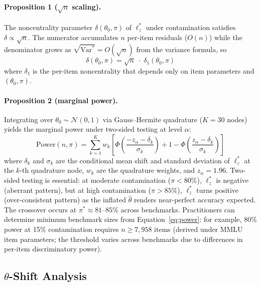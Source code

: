 \paragraph{Proposition 1 ($\sqrt{n}$ scaling).}
The noncentrality parameter $\delta(\theta_0, \pi)$ of $\ell_z^*$ under contamination satisfies $\delta \propto \sqrt{n}$.
The numerator accumulates $n$ per-item residuals ($O(n)$) while the denominator grows as $\sqrt{\mathrm{Var}^*} = O(\sqrt{n})$ from the \citet{snijders2001} variance formula, so
\begin{equation}
  \delta(\theta_0, \pi) = \sqrt{n}\;\cdot\;\delta_1(\theta_0, \pi)
  \label{eq:sqrt_n}
\end{equation}
where $\delta_1$ is the per-item noncentrality that depends only on item parameters and $(\theta_0, \pi)$.

\paragraph{Proposition 2 (marginal power).}
Integrating over $\theta_0 \sim \mathcal{N}(0,1)$ via Gauss--Hermite quadrature ($K{=}30$ nodes) yields the marginal power under two-sided testing at level $\alpha$:
\begin{equation}
  \mathrm{Power}(n, \pi) = \sum_{k=1}^{K} w_k \left[\Phi\!\left(\frac{-z_\alpha - \delta_k}{\sigma_k}\right) + 1 - \Phi\!\left(\frac{z_\alpha - \delta_k}{\sigma_k}\right)\right]
  \label{eq:power}
\end{equation}
where $\delta_k$ and $\sigma_k$ are the conditional mean shift and standard deviation of $\ell_z^*$ at the $k$-th quadrature node, $w_k$ are the quadrature weights, and $z_\alpha = 1.96$.
Two-sided testing is essential: at moderate contamination ($\pi < 80\%$), $\ell_z^*$ is negative (aberrant pattern), but at high contamination ($\pi > 85\%$), $\ell_z^*$ turns positive (over-consistent pattern) as the inflated $\hat{\theta}$ renders near-perfect accuracy expected.
The crossover occurs at $\pi^* \approx 81$--$85\%$ across benchmarks.
Practitioners can determine minimum benchmark sizes from Equation~\ref{eq:power}: for example, 80\% power at 15\% contamination requires $n \geq 7{,}958$ items (derived under MMLU item parameters; the threshold varies across benchmarks due to differences in per-item discriminatory power).

\subsection{$\theta$-Shift Analysis}
\label{sec:theta_shift}

